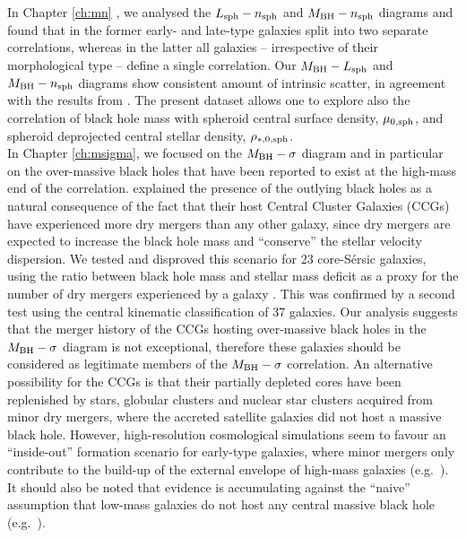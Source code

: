 In Chapter \ref{ch:mn} \citep{paperIII}, 
we analysed the $L_{\rm sph} - n_{\rm sph}$ and $M_{\rm BH} - n_{\rm sph}$ diagrams 
and found that in the former early- and late-type galaxies split into two separate correlations, 
whereas in the latter all galaxies -- irrespective of their morphological type -- define a single correlation. 
Our $M_{\rm BH} - L_{\rm sph}$ and $M_{\rm BH} - n_{\rm sph}$ diagrams 
show consistent amount of intrinsic scatter, 
in agreement with the results from \citet{grahamdriver2007}. 
The present dataset allows one to explore also the correlation of black hole mass with 
spheroid central surface density, $\mu_{\rm 0, sph}$, 
and spheroid deprojected central stellar density, $\rho_{\rm *,0,sph}$. \\

In Chapter \ref{ch:msigma}, we focused on the $M_{\rm BH} - \sigma$ diagram 
and in particular on the over-massive black holes that have been reported to exist 
at the high-mass end of the correlation. 
\citet{volontericiotti2013} explained the presence of the outlying black holes 
as a natural consequence of the fact that their host Central Cluster Galaxies (CCGs) have experienced more dry mergers 
than any other galaxy, 
since dry mergers are expected to increase the black hole mass 
and ``conserve'' the stellar velocity dispersion. 
We tested and disproved this scenario for 23 core-S\'ersic galaxies, 
using the ratio between black hole mass and stellar mass deficit as a proxy 
for the number of dry mergers experienced by a galaxy \citep{merritt2006}. 
This was confirmed by a second test using the central kinematic classification of 37 galaxies. 
Our analysis suggests that 
the merger history of the CCGs hosting over-massive black holes in the $M_{\rm BH} - \sigma$ diagram 
is not exceptional, 
therefore these galaxies should be considered as legitimate members of the $M_{\rm BH} - \sigma$ correlation. 
An alternative possibility for the CCGs is that their partially depleted cores 
have been replenished by stars, globular clusters and nuclear star clusters 
acquired from minor dry mergers, 
where the accreted satellite galaxies did not host a massive black hole. 
However, high-resolution cosmological simulations seem to favour an ``inside-out'' formation scenario 
for early-type galaxies, 
where minor mergers only contribute to the build-up of the external envelope of high-mass galaxies 
(e.g.~\citealt{wellons2016}). 
It should also be noted that evidence is accumulating against the ``naive'' assumption 
that low-mass galaxies do not host any central massive black hole 
(e.g.~\citealt{Baldassare2015,Graham2016LEDA}). \\

